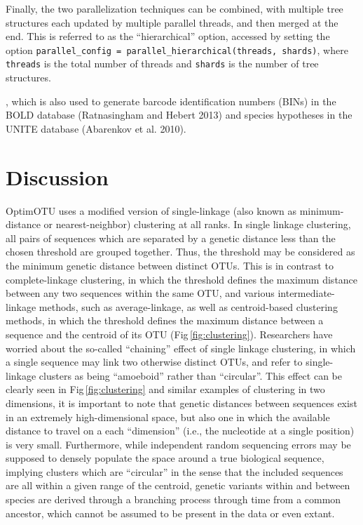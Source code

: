 \documentclass[
]{article}
\begin{document}
Finally, the two parallelization techniques can be combined, with multiple tree structures each updated by multiple parallel threads, and then merged at the end.
This is referred to as the ``hierarchical'' option, accessed by setting the option \texttt{parallel\_config\ =\ parallel\_hierarchical(threads,\ shards)}, where \texttt{threads} is the total number of threads and \texttt{shards} is the number of tree structures.

, which is also used to generate barcode identification numbers (BINs) in the BOLD database (Ratnasingham and Hebert 2013) and species hypotheses in the UNITE database (Abarenkov et al. 2010).

\section{Discussion}\label{discussion}

OptimOTU uses a modified version of single-linkage (also known as minimum-distance or nearest-neighbor) clustering at all ranks.
In single linkage clustering, all pairs of sequences which are separated by a genetic distance less than the chosen threshold are grouped together.
Thus, the threshold may be considered as the minimum genetic distance between distinct OTUs.
This is in contrast to complete-linkage clustering, in which the threshold defines the maximum distance between any two sequences within the same OTU, and
various intermediate-linkage methods, such as average-linkage, as well as centroid-based clustering methods, in which the threshold defines the maximum distance between a sequence and the centroid of its OTU (Fig\,\ref{fig:clustering}).
Researchers have worried about the so-called ``chaining'' effect of single linkage clustering, in which a single sequence may link two otherwise distinct OTUs, and refer to single-linkage clusters as being ``amoeboid'' rather than ``circular''.
This effect can be clearly seen in Fig\,\ref{fig:clustering} and similar examples of clustering in two dimensions, it is important to note that genetic distances between sequences exist in an extremely high-dimensional space, but also one in which the available distance to travel on a each ``dimension'' (i.e., the nucleotide at a single position) is very small.
Furthermore, while independent random sequencing errors may be supposed to densely populate the space around a true biological sequence, implying clusters which are ``circular'' in the sense that the included sequences are all within a given range of the centroid, genetic variants within and between species are
derived through a branching process through time from a common ancestor, which cannot be assumed to be present in the data or even extant.
\end{document}
